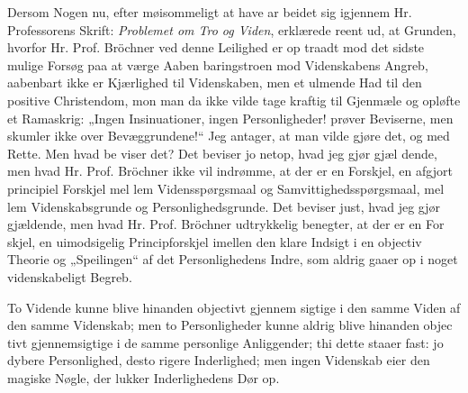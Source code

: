 \documentclass[12pt]{book}
\begin{document}
Dersom Nogen nu, efter møisommeligt at have ar\-%
beidet sig igjennem Hr. Professorens Skrift: \emph{Problemet
om Tro og Viden}, erklærede reent ud, at Grunden,
hvorfor Hr. Prof. Bröchner ved denne Leilighed er op\-%
traadt mod det sidste mulige Forsøg paa at værge Aaben\-%
baringstroen mod Videnskabens Angreb, aabenbart ikke
er Kjærlighed til Videnskaben, men et ulmende Had til
den positive Christendom, mon man da ikke vilde tage
kraftig til Gjenmæle og opløfte et Ramaskrig: „Ingen
Insinuationer, ingen Personligheder! prøver Beviserne,
men skumler ikke over Bevæggrundene!“ Jeg antager,
at man vilde gjøre det, og med Rette. Men hvad be\-%
viser det? Det beviser jo netop, hvad jeg gjør gjæl\-%
dende, men hvad Hr. Prof. Bröchner ikke vil indrømme,
at der er en Forskjel, en afgjort principiel Forskjel mel\-%
lem Vidensspørgsmaal og Samvittighedsspørgsmaal, mel\-%
lem Videnskabsgrunde og Personlighedsgrunde. Det
beviser just, hvad jeg gjør gjældende, men hvad Hr.
Prof. Bröchner udtrykkelig benegter, at der er en For\-%
skjel, en uimodsigelig Principforskjel imellen den klare %
Indsigt i en objectiv Theorie og „Speilingen“ af det
Personlighedens Indre, som aldrig gaaer op i noget
videnskabeligt Begreb.

To Vidende kunne blive hinanden objectivt gjennem\-%
sigtige i den samme Viden af den samme Videnskab;
men to Personligheder kunne aldrig blive hinanden objec\-%
tivt gjennemsigtige i de samme personlige Anliggender;
thi dette staaer fast: jo dybere Personlighed, desto rigere
Inderlighed; men ingen Videnskab eier den magiske Nøgle,
der lukker Inderlighedens Dør op.
\end{document}
